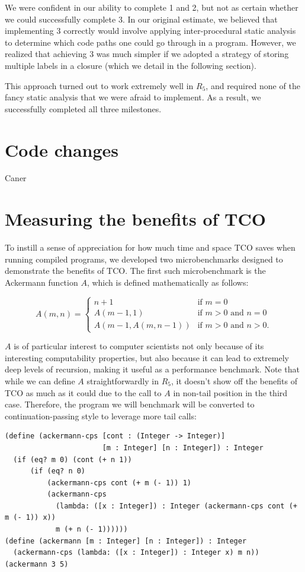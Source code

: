 \documentclass[12pt]{article}
\begin{document}
We were confident in our ability to complete 1 and 2, but not as certain whether
we could successfully complete 3. In our original estimate, we believed that
implementing 3 correctly would involve applying inter-procedural static analysis
to determine which code paths one could go through in a program. However, we
realized that achieving 3 was much simpler if we adopted a strategy of storing
multiple labels in a closure (which we detail in the following section).

This approach turned out to work extremely well in $R_5$, and required none of the
fancy static analysis that we were afraid to implement. As a result, we successfully
completed all three milestones.

\section{Code changes}
Caner

\section{Measuring the benefits of TCO}

To instill a sense of appreciation for how much time and space TCO saves when running
compiled programs, we developed two microbenchmarks designed to demonstrate the benefits
of TCO. The first such microbenchmark is the Ackermann function $A$, which is defined
mathematically as follows:

$$
A(m, n) = \begin{cases}
  n+1               & \mbox{if } m = 0 \\
  A(m-1, 1)         & \mbox{if } m > 0 \mbox{ and } n = 0 \\
  A(m-1, A(m, n-1)) & \mbox{if } m > 0 \mbox{ and } n > 0.
\end{cases}
$$

$A$ is of particular interest to computer scientists not only
because of its interesting computability properties, but also because it can lead
to extremely deep levels of recursion, making it useful as a performance benchmark.
Note that while we can define $A$ straightforwardly in $R_5$, it doesn't show off
the benefits of TCO as much as it could due to the call to $A$ in non-tail position
in the third case. Therefore, the program we will benchmark will be converted
to continuation-passing style to leverage more tail calls:

\begin{verbatim}
(define (ackermann-cps [cont : (Integer -> Integer)]
                       [m : Integer] [n : Integer]) : Integer
  (if (eq? m 0) (cont (+ n 1))
      (if (eq? n 0)
          (ackermann-cps cont (+ m (- 1)) 1)
          (ackermann-cps
            (lambda: ([x : Integer]) : Integer (ackermann-cps cont (+ m (- 1)) x))
            m (+ n (- 1))))))
(define (ackermann [m : Integer] [n : Integer]) : Integer
  (ackermann-cps (lambda: ([x : Integer]) : Integer x) m n))
(ackermann 3 5)
\end{verbatim}
\end{document}
